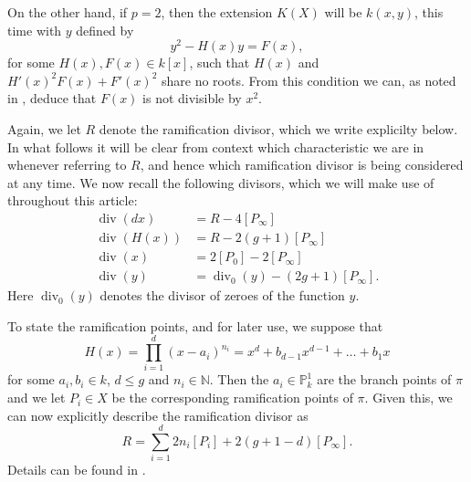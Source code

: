 \documentclass[draft, 11pt]{article} %
\theoremstyle{plain}
\theoremstyle{remark}
\DeclareMathOperator{\di}{div}
\begin{document}
On the other hand, if $p=2$, then the extension $K(X)$ will be $k(x,y)$, this time with $y$ defined by
\begin{equation}\label{definep=2}
y^2 - H(x)y = F(x),
\end{equation}
for some $H(x),F(x) \in k[x]$, such that $H(x)$ and $H'(x)^2F(x) + F'(x)^2$ share no roots.
From this condition we can, as noted in \cite[\S 6]{faithfulaction}, deduce that $F(x)$ is not divisible by $x^2$.

Again, we let $R$ denote the ramification divisor, which we write explicilty below.
In what follows it will be clear from context which characteristic we are in whenever referring to $R$, and hence which ramification divisor is being considered at any time.
We now recall the following divisors, which we will make use of throughout this article:
\begin{align}
\di (dx) & = R - 4[P_\infty] \label{divdxp=2}\\
\di (H(x)) & = R - 2(g+1)[P_\infty] \label{divhp=2}\\
\di (x) & = 2[P_0] - 2[P_\infty] \label{divxp=2}\\
\di (y) & = \di_0(y) - (2g+1)[P_\infty] \label{divyp=2}.
\end{align}
Here $\di_0(y)$ denotes the divisor of zeroes of the function $y$.


To state the ramification points, and for later use, we suppose that 
\begin{equation}\label{hcoefficients}
H(x) = \prod_{i=1}^d (x-a_i)^{n_i} = x^d + b_{d-1}x^{d-1} + \ldots + b_1x
\end{equation}
for some $a_i, b_i \in  k$, $d \leq g$ and $n_i \in \mathbb N$.
Then the $a_i \in \mathbb P_k^1$ are the branch points of $\pi$ and we let $P_i \in X$ be the corresponding ramification points of $\pi$.
Given this, we can now explicitly describe the ramification divisor as
\[
R = \sum_{i=1}^d 2n_i[P_i] + 2(g+1-d)[P_\infty].
\]
Details can be found in \cite[\S 6]{faithfulaction}.
\end{document}
